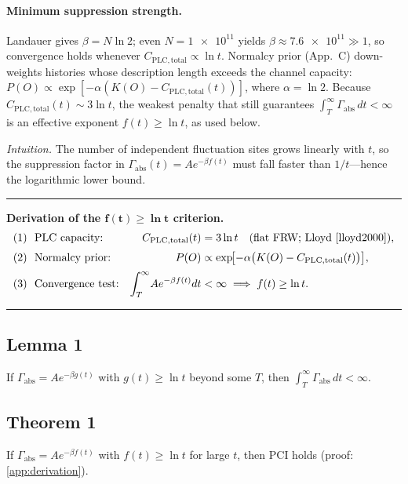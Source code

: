 \documentclass[12pt]{article}
\newcommand{\PCI}{PCI\xspace}
\begin{document}
\paragraph{Minimum suppression strength.}
Landauer gives $\beta=N\ln2$; even $N=\num{1e11}$ yields
$\beta\approx\num{7.6e11}\gg1$, so convergence holds whenever
$C_{\mathrm{PLC,total}}\propto\ln t.$ Normalcy prior (App.~C) down-weights histories whose description length
exceeds the channel capacity:
$P(O)\propto\exp\![-\alpha(K(O)-C_{\mathrm{PLC,total}}(t))]$,
where $\alpha=\ln 2$.
Because $C_{\mathrm{PLC,total}}(t)\sim 3\ln t$, the weakest penalty that
still guarantees $\int_T^\infty\Gamma_{\text{abs}}\,dt<\infty$ is an
effective exponent $f(t)\!\ge\!\ln t$, as used below.

\noindent\emph{Intuition.}  The number of independent fluctuation sites
grows linearly with $t$, so the suppression factor in
$\Gamma_{\text{abs}}(t)=A e^{-\beta f(t)}$ must fall faster than
$1/t$—hence the logarithmic lower bound.

\medskip
\hrule\smallskip
\noindent\textbf{Derivation of the $\boldsymbol{f(t)\ge\ln t}$ criterion.}
\begin{equation*}
\begin{aligned}
&\text{(1)~~PLC capacity:}      & C_{\mathrm{PLC,total}}(t) &= 3\ln t \quad (\text{flat FRW; Lloyd \cite{lloyd2000}}),\\[2pt]
&\text{(2)~~Normalcy prior:}    & P(O) &\propto
   \exp\!\bigl[-\alpha\bigl(K(O)-C_{\mathrm{PLC,total}}(t)\bigr)\bigr],\\[2pt]
&\text{(3)~~Convergence test:}  & \int_{T}^{\infty}\! A e^{-\beta f(t)}dt
    &<\infty \;\Longrightarrow\; f(t)\ge\ln t .
\end{aligned}
\end{equation*}
\smallskip\hrule\medskip

\subsection*{Lemma 1}
If $\Gamma_{\text{abs}}=Ae^{-\beta g(t)}$ with $g(t)\ge\ln t$ beyond some $T$, then $\int_T^\infty\Gamma_{\text{abs}}\,dt<\infty.$

\subsection*{Theorem 1}
If $\Gamma_{\text{abs}}=Ae^{-\beta f(t)}$ with $f(t)\ge\ln t$ for large $t$, then \PCI holds (proof: \autoref{app:derivation}).
\end{document}
